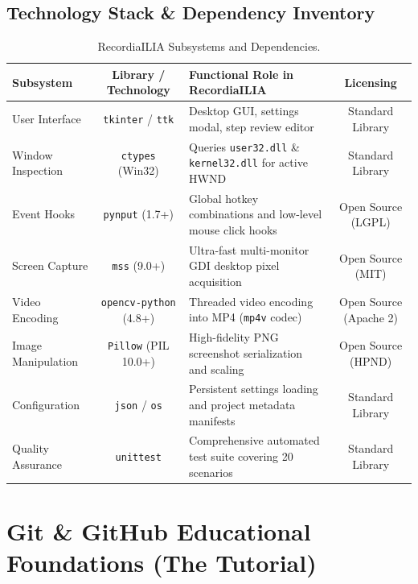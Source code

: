 \documentclass[10pt,a4paper]{article}
\begin{document}
\subsection{Technology Stack \& Dependency Inventory}
\begin{table}[h!]
\centering
\small
\begin{tabularx}{\textwidth}{l c X c}
\toprule
\textbf{Subsystem} & \textbf{Library / Technology} & \textbf{Functional Role in RecordiaILIA} & \textbf{Licensing} \\
\midrule
User Interface & \texttt{tkinter} / \texttt{ttk} & Desktop GUI, settings modal, step review editor & Standard Library \\
Window Inspection & \texttt{ctypes} (Win32) & Queries \texttt{user32.dll} \& \texttt{kernel32.dll} for active HWND & Standard Library \\
Event Hooks & \texttt{pynput} (1.7+) & Global hotkey combinations and low-level mouse click hooks & Open Source (LGPL) \\
Screen Capture & \texttt{mss} (9.0+) & Ultra-fast multi-monitor GDI desktop pixel acquisition & Open Source (MIT) \\
Video Encoding & \texttt{opencv-python} (4.8+) & Threaded video encoding into MP4 (\texttt{mp4v} codec) & Open Source (Apache 2) \\
Image Manipulation & \texttt{Pillow} (PIL 10.0+) & High-fidelity PNG screenshot serialization and scaling & Open Source (HPND) \\
Configuration & \texttt{json} / \texttt{os} & Persistent settings loading and project metadata manifests & Standard Library \\
Quality Assurance & \texttt{unittest} & Comprehensive automated test suite covering 20 scenarios & Standard Library \\
\bottomrule
\end{tabularx}
\caption{RecordiaILIA Subsystems and Dependencies.}
\end{table}

\newpage
\section{Git \& GitHub Educational Foundations (The Tutorial)}
\end{document}
